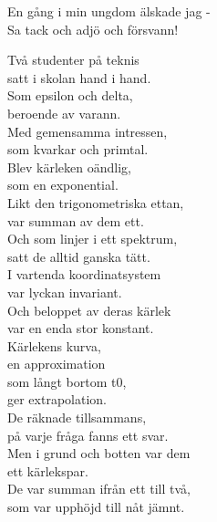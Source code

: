 \documentclass[a6paper,10pt]{article}
\begin{document}
\begin{center}
\end{center}
\begin{lyrics}
En gång i min ungdom älskade jag - \\
Sa tack och adjö och försvann!
\end{lyrics}
\vspace{20pt}
\begin{center}
\end{center}
\begin{lyrics}
Två studenter på teknis \\
satt i skolan hand i hand. \\
Som epsilon och delta, \\
beroende av varann. \\
Med gemensamma intressen, \\
som kvarkar och primtal. \\
Blev kärleken oändlig, \\
som en exponential. 
\vspace{5pt}\\
Likt den trigonometriska ettan, \\
var summan av dem ett. \\
Och som linjer i ett spektrum, \\
satt de alltid ganska tätt. \\
I vartenda koordinatsystem \\
var lyckan invariant. \\
Och beloppet av deras kärlek \\
var en enda stor konstant. \\
\setlength{\oddsidemargin}{-0.47in}
\noindent
Kärlekens kurva, \\
en approximation \\
som långt bortom t0, \\
ger extrapolation. \\
De räknade tillsammans, \\
på varje fråga fanns ett svar. \\
Men i grund och botten var dem \\
ett kärlekspar.
\vspace{5pt}\\
De var summan ifrån ett till två, \\
som var upphöjd till nåt jämnt. \\

\end{lyrics}
\end{document}
